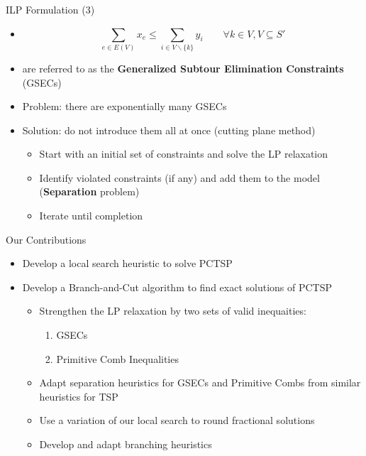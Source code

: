 \begin{frame}[t]{ILP Formulation (3)}
    \begin{itemize}
        \item<1->[ ]
        \[  \sum_{e \in E(V) } x_e \leq \sum_{i \in V \backslash\{ k \}} y_{i} \qquad \forall k \in V, V\subseteq S' \]
        \item<2->  are referred to as the \textbf{Generalized Subtour Elimination Constraints} (GSECs) 
        \item<3-> Problem: there are exponentially many GSECs
        \item<4-> Solution: do not introduce them all at once (cutting plane method)
            \begin{itemize}
                \item<5-> Start with an initial set of constraints and solve the LP relaxation
                \item<6-> Identify violated constraints (if any) and add them to the model (\textbf{Separation} problem)
                \item<7-> Iterate until completion
            \end{itemize}    
    \end{itemize}
\end{frame}

\begin{frame}[t]{Our Contributions}
    \begin{itemize}
        \item<1-> Develop a \alert{local search} heuristic to solve PCTSP
        \item<2-> Develop a \alert{Branch-and-Cut} algorithm to find exact solutions of PCTSP
            \begin{itemize}
                \item<3-> Strengthen the LP relaxation by two sets of valid inequaities:
                    \begin{enumerate}
                        \item<4-> GSECs
                        \item<5-> Primitive Comb Inequalities
                    \end{enumerate}
                \item<6-> Adapt \alert{separation heuristics} for GSECs and Primitive Combs from similar heuristics for TSP
                \item<7-> Use a variation of our local search to \alert{round} fractional solutions
                \item<8-> Develop and adapt \alert{branching heuristics}
            \end{itemize}
    \end{itemize}
\end{frame}

